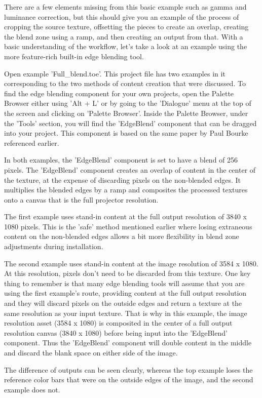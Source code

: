 \begin{fullwidth}
There are a few elements missing from this basic example such as gamma and luminance correction, but this should give you an example of the process of cropping the source texture, offsetting the pieces to create an overlap, creating the blend zone using a ramp, and then creating an output from that. With a basic understanding of the workflow, let's take a look at an example using the more feature-rich built-in edge blending tool.

Open example 'Full\_blend.toe'. This project file has two examples in it corresponding to the two methods of content creation that were discussed. To find the edge blending component for your own projects, open the Palette Browser either using 'Alt + L' or by going to the 'Dialogue' menu at the top of the screen and clicking on 'Palette Browser'. Inside the Palette Browser, under the 'Tools' section, you will find the 'EdgeBlend' component that can be dragged into your project. This component is based on the same paper by Paul Bourke referenced earlier.

In both examples, the 'EdgeBlend' component is set to have a blend of 256 pixels. The 'EdgeBlend' component creates an overlap of content in the center of the texture, at the expense of discarding pixels on the non-blended edges. It multiplies the blended edges by a ramp and composites the processed textures onto a canvas that is the full projector resolution.

The first example uses stand-in content at the full output resolution of 3840 x 1080 pixels. This is the 'safe' method mentioned earlier where losing extraneous content on the non-blended edges allows a bit more flexibility in blend zone adjustments during installation.

The second example uses stand-in content at the image resolution of 3584 x 1080. At this resolution, pixels don't need to be discarded from this texture. One key thing to remember is that many edge blending tools will assume that you are using the first example's route, providing content at the full output resolution and they will discard pixels on the outside edges and return a texture at the same resolution as your input texture. That is why in this example, the image resolution asset (3584 x 1080) is composited in the center of a full output resolution canvas (3840 x 1080) before being input into the 'EdgeBlend' component. Thus the 'EdgeBlend' component will double content in the middle and discard the blank space on either side of the image.

The difference of outputs can be seen clearly, whereas the top example loses the reference color bars that were on the outside edges of the image, and the second example does not.


\end{fullwidth}
